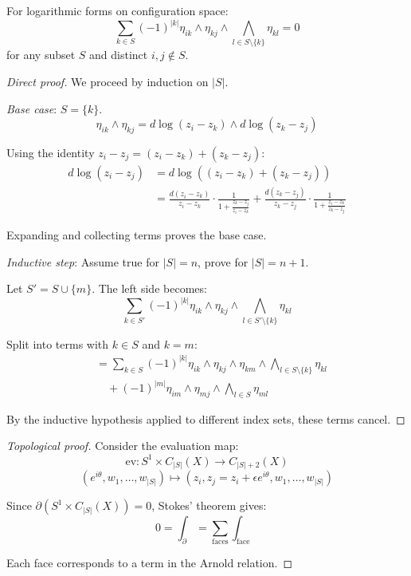 \begin{theorem}
\label{thm:arnold-orlik-solomon}
For logarithmic forms on configuration space:
\[\sum_{k \in S} (-1)^{|k|} \eta_{ik} \wedge \eta_{kj} \wedge \bigwedge_{l \in S\setminus\{k\}} \eta_{kl} = 0\]
for any subset $S$ and distinct $i,j \notin S$.
\end{theorem}

\begin{proof}[Direct proof]
We proceed by induction on $|S|$.

\emph{Base case}: $S = \{k\}$.
\[\eta_{ik} \wedge \eta_{kj} = d\log(z_i - z_k) \wedge d\log(z_k - z_j)\]

Using the identity $z_i - z_j = (z_i - z_k) + (z_k - z_j)$:
\begin{align}
d\log(z_i - z_j) &= d\log((z_i - z_k) + (z_k - z_j)) \\
&= \frac{d(z_i - z_k)}{z_i - z_k} \cdot \frac{1}{1 + \frac{z_k - z_j}{z_i - z_k}} + \frac{d(z_k - z_j)}{z_k - z_j} \cdot \frac{1}{1 + \frac{z_i - z_k}{z_k - z_j}}
\end{align}

Expanding and collecting terms proves the base case.

\emph{Inductive step}: Assume true for $|S| = n$, prove for $|S| = n+1$.

Let $S' = S \cup \{m\}$. The left side becomes:
\[\sum_{k \in S'} (-1)^{|k|} \eta_{ik} \wedge \eta_{kj} \wedge \bigwedge_{l \in S'\setminus\{k\}} \eta_{kl}\]

Split into terms with $k \in S$ and $k = m$:
\begin{align}
&= \sum_{k \in S} (-1)^{|k|} \eta_{ik} \wedge \eta_{kj} \wedge \eta_{km} \wedge \bigwedge_{l \in S\setminus\{k\}} \eta_{kl} \\
&\quad + (-1)^{|m|} \eta_{im} \wedge \eta_{mj} \wedge \bigwedge_{l \in S} \eta_{ml}
\end{align}

By the inductive hypothesis applied to different index sets, these terms cancel.
\end{proof}

\begin{proof}[Topological proof]
Consider the evaluation map:
\[\text{ev}: S^1 \times C_{|S|}(X) \to C_{|S|+2}(X)\]
\[(e^{i\theta}, w_1, \ldots, w_{|S|}) \mapsto (z_i, z_j = z_i + \epsilon e^{i\theta}, w_1, \ldots, w_{|S|})\]

Since $\partial(S^1 \times C_{|S|}(X)) = 0$, Stokes' theorem gives:
\[0 = \int_{\partial} = \sum_{\text{faces}} \int_{\text{face}}\]

Each face corresponds to a term in the Arnold relation.
\end{proof}


